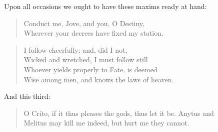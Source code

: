 Upon all occasions we ought to have these maxims ready at hand:

\begin{quote}
  Conduct me, Jove, and you, O Destiny, \\
  Wherever your decrees have fixed my station.\footnotemark
\end{quote}

\begin{quote}
  I follow cheerfully; and, did I not, \\
  Wicked and wretched, I must follow still \\
  Whoever yields properly to Fate, is deemed \\
  Wise among men, and knows the laws of heaven.\footnotemark
\end{quote}

And this third: 

\begin{quote}
  O Crito, if it thus pleases the gods, thus let it be. Anytus and \\
  Melitus may kill me indeed, but hurt me they cannot.\footnotemark
\end{quote}
